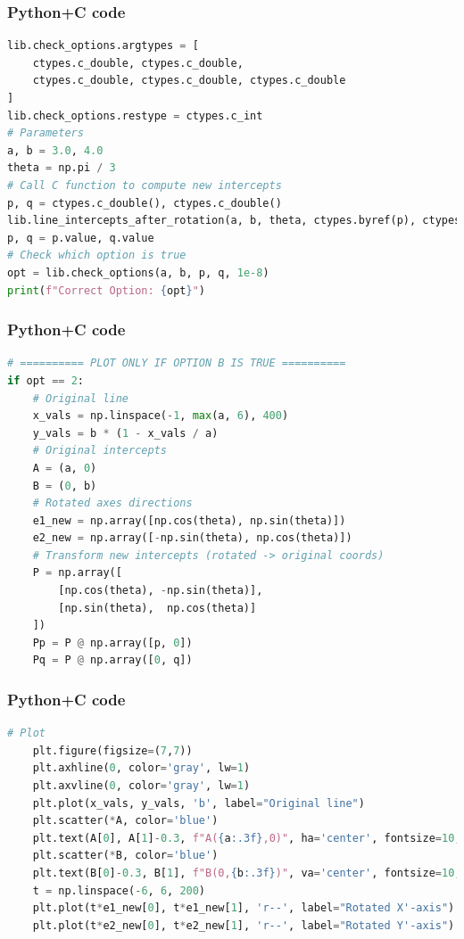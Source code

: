 \documentclass{beamer}
\begin{document}
\begin{frame}[fragile]
    \frametitle{Python+C code}

    \begin{lstlisting}[language=Python]
lib.check_options.argtypes = [
    ctypes.c_double, ctypes.c_double,
    ctypes.c_double, ctypes.c_double, ctypes.c_double
]
lib.check_options.restype = ctypes.c_int
# Parameters
a, b = 3.0, 4.0
theta = np.pi / 3
# Call C function to compute new intercepts
p, q = ctypes.c_double(), ctypes.c_double()
lib.line_intercepts_after_rotation(a, b, theta, ctypes.byref(p), ctypes.byref(q))
p, q = p.value, q.value
# Check which option is true
opt = lib.check_options(a, b, p, q, 1e-8)
print(f"Correct Option: {opt}")

    \end{lstlisting}
\end{frame}

\begin{frame}[fragile]
    \frametitle{Python+C code}

    \begin{lstlisting}[language=Python]
# ========== PLOT ONLY IF OPTION B IS TRUE ==========
if opt == 2:
    # Original line
    x_vals = np.linspace(-1, max(a, 6), 400)
    y_vals = b * (1 - x_vals / a)
    # Original intercepts
    A = (a, 0)
    B = (0, b)
    # Rotated axes directions
    e1_new = np.array([np.cos(theta), np.sin(theta)])
    e2_new = np.array([-np.sin(theta), np.cos(theta)])
    # Transform new intercepts (rotated -> original coords)
    P = np.array([
        [np.cos(theta), -np.sin(theta)],
        [np.sin(theta),  np.cos(theta)]
    ])
    Pp = P @ np.array([p, 0])
    Pq = P @ np.array([0, q])

    \end{lstlisting}
\end{frame}

\begin{frame}[fragile]
    \frametitle{Python+C code}

    \begin{lstlisting}[language=Python]
   # Plot
    plt.figure(figsize=(7,7))
    plt.axhline(0, color='gray', lw=1)
    plt.axvline(0, color='gray', lw=1)
    plt.plot(x_vals, y_vals, 'b', label="Original line")
    plt.scatter(*A, color='blue')
    plt.text(A[0], A[1]-0.3, f"A({a:.3f},0)", ha='center', fontsize=10, color="blue")
    plt.scatter(*B, color='blue')
    plt.text(B[0]-0.3, B[1], f"B(0,{b:.3f})", va='center', fontsize=10, color="blue")
    t = np.linspace(-6, 6, 200)
    plt.plot(t*e1_new[0], t*e1_new[1], 'r--', label="Rotated X'-axis")
    plt.plot(t*e2_new[0], t*e2_new[1], 'r--', label="Rotated Y'-axis")

 

    \end{lstlisting}
    
\end{frame}
\end{document}
